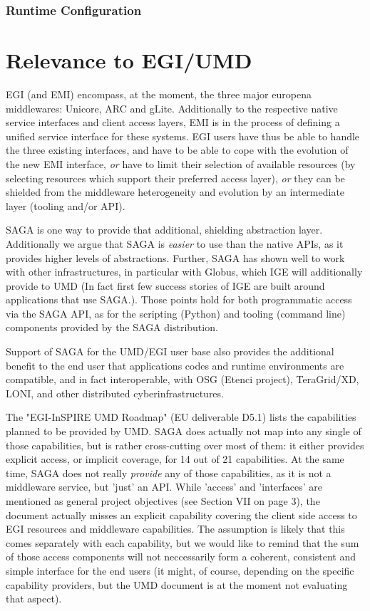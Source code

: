 \documentclass[12pt]{article}
\newcommand{\I}[1]{\textit{#1}}
\begin{document}
\subsubsection*{Runtime Configuration}

   
\section{Relevance to EGI/UMD}

 EGI (and EMI) encompass, at the moment, the three major europena
 middlewares: Unicore, ARC and gLite.  Additionally to the respective
 native service interfaces and client access layers, EMI is in the
 process of defining a unified service interface for these systems.
 EGI users have thus be able to handle the three existing interfaces,
 and have to be able to cope with the evolution of the new EMI
 interface, \I{or} have to limit their selection of available
 resources (by selecting resources which support their preferred
 access layer), \I{or} they can be shielded from the middleware
 heterogeneity and evolution by an intermediate layer (tooling and/or
 API).  
 
 SAGA is one way to provide that additional, shielding abstraction
 layer.  Additionally we argue that SAGA is \I{easier} to use than the
 native APIs, as it provides higher levels of abstractions.  Further,
 SAGA has shown well to work with other infrastructures, in particular
 with Globus, which IGE will additionally provide to UMD (In fact
 first few success stories of IGE are built around applications that
 use SAGA.).  Those points hold for both programmatic access via the
 SAGA API, as for the scripting (Python) and tooling (command line)
 components provided by the SAGA distribution.

 Support of SAGA for the UMD/EGI user base also provides the
 additional benefit to the end user that applications codes and
 runtime environments are compatible, and in fact interoperable, with
 OSG (Etenci project), TeraGrid/XD, LONI, and other distributed
 cyberinfrastructures.

 The "EGI-InSPIRE UMD Roadmap" (EU deliverable D5.1) lists the
 capabilities planned to be provided by UMD.  SAGA does actually not
 map into any single of those capabilities, but is rather
 cross-cutting over most of them: it either provides explicit access,
 or implicit coverage, for 14 out of 21 capabilities.  At the same
 time, SAGA does not really \I{provide} any of those capabilities, as
 it is not a middleware service, but 'just' an API.  While 'access'
 and 'interfaces' are mentioned as general project objectives (see
 Section VII on page 3), the document actually misses an explicit
 capability covering the client side access to EGI resources and
 middleware capabilities.  The assumption is likely that this comes
 separately with each capability, but we would like to remind that the
 sum of those access components will not neccessarily form a coherent,
 consistent and simple interface for the end users (it might, of
 course, depending on the specific capability providers, but the UMD
 document is at the moment not evaluating that aspect).
\end{document}
